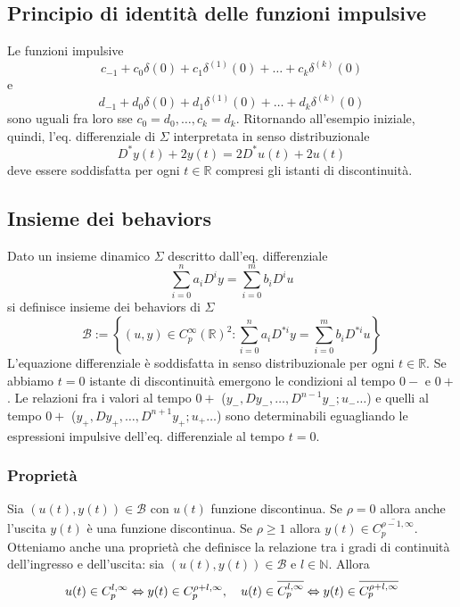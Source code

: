 \documentclass[11pt]{article}
\begin{document}
\subsection{Principio di identità delle funzioni impulsive}
Le funzioni impulsive
\begin{displaymath}
    c_{-1} + c_0 \delta(0) + c_1 \delta^{(1)}(0)+\dots+c_k\delta^{(k)}(0)
\end{displaymath}
e
\begin{displaymath}
    d_{-1} + d_0\delta(0)+d_1\delta^{(1)}(0)+\dots+d_k\delta^{(k)}(0)
\end{displaymath}
sono uguali fra loro sse $c_0=d_0,\dots,c_k=d_k$.
Ritornando all'esempio iniziale, quindi, l'eq. differenziale di $\Sigma$ interpretata in senso distribuzionale
\begin{displaymath}
    D^* y(t) + 2y(t) = 2D^* u(t) + 2u(t)
\end{displaymath}
deve essere soddisfatta per ogni $t \in \mathbb{R}$ compresi gli istanti di discontinuità.
\subsection{Insieme dei behaviors}
Dato un insieme dinamico $\Sigma$ descritto dall'eq. differenziale
\begin{displaymath}
    \sum_{i=0}^n a_i D^i y = \sum_{i=0}^m b_i D^i u
\end{displaymath}
si definisce insieme dei behaviors di $\Sigma$
\begin{displaymath}
    \mathcal{B}:= \left\{(u,y)\in C_p^\infty (\mathbb{R})^2: \sum_{i=0}^n a_i D^{*i} y = \sum_{i=0}^m b_i D^{*i}u\right\}
\end{displaymath}
L'equazione differenziale è soddisfatta in senso distribuzionale per ogni $t \in \mathbb{R}$. Se abbiamo $t=0$ istante di discontinuità emergono le condizioni al tempo $0-$ e $0+$. Le relazioni fra i valori al tempo $0+$ ($y_-, Dy_-,\dots,D^{n-1}y_-; u_-\dots$) e quelli al tempo $0+$ ($y_+, Dy_+,\dots,D^{n+1}y_+; u_+\dots$) sono determinabili eguagliando le espressioni impulsive dell'eq. differenziale al tempo $t=0$.
\subsubsection{Proprietà}
Sia $\left(u(t),y(t)\right) \in \mathcal{B}$ con $u(t)$ funzione discontinua. Se $\rho=0$ allora anche l'uscita $y(t)$ è una funzione discontinua. Se $\rho\ge1$ allora $y(t) \in \overline{C_p^{\rho-1,\infty}}$.\\
Otteniamo anche una proprietà che definisce la relazione tra i gradi di continuità dell'ingresso e dell'uscita: sia $\left(u(t),y(t)\right) \in \mathcal{B}$ e $l \in \mathbb{N}$. Allora
\begin{displaymath}
    u(t)\in C_p^{l,\infty} \Leftrightarrow y(t)\in C_p^{\rho+l,\infty}, \hspace{10px}u(t)\in \overline{C_p^{l,\infty} }\Leftrightarrow y(t)\in \overline{C_p^{\rho+l,\infty}}
\end{displaymath}
\end{document}
